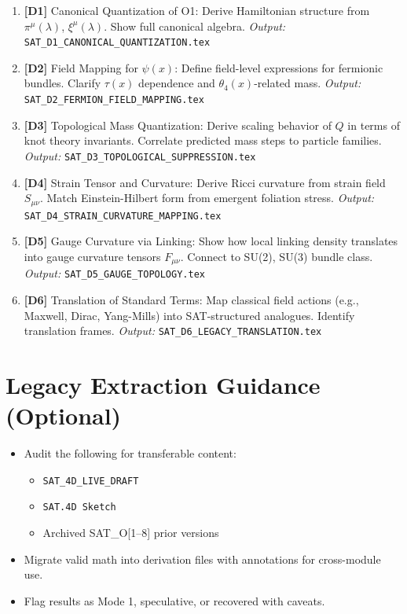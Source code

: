 \documentclass[12pt]{article}
\begin{document}
\begin{enumerate}
    \item \textbf{[D1]} Canonical Quantization of O1:  
    Derive Hamiltonian structure from \(\pi^\mu(\lambda)\), \(\xi^\mu(\lambda)\). Show full canonical algebra.  
    \textit{Output:} \texttt{SAT\_D1\_CANONICAL\_QUANTIZATION.tex}

    \item \textbf{[D2]} Field Mapping for \(\psi(x)\):  
    Define field-level expressions for fermionic bundles. Clarify \(\tau(x)\) dependence and \( \theta_4(x) \)-related mass.  
    \textit{Output:} \texttt{SAT\_D2\_FERMION\_FIELD\_MAPPING.tex}

    \item \textbf{[D3]} Topological Mass Quantization:  
    Derive scaling behavior of \( Q \) in terms of knot theory invariants. Correlate predicted mass steps to particle families.  
    \textit{Output:} \texttt{SAT\_D3\_TOPOLOGICAL\_SUPPRESSION.tex}

    \item \textbf{[D4]} Strain Tensor and Curvature:  
    Derive Ricci curvature from strain field \( S_{\mu\nu} \). Match Einstein-Hilbert form from emergent foliation stress.  
    \textit{Output:} \texttt{SAT\_D4\_STRAIN\_CURVATURE\_MAPPING.tex}

    \item \textbf{[D5]} Gauge Curvature via Linking:  
    Show how local linking density translates into gauge curvature tensors \( F_{\mu\nu} \). Connect to SU(2), SU(3) bundle class.  
    \textit{Output:} \texttt{SAT\_D5\_GAUGE\_TOPOLOGY.tex}

    \item \textbf{[D6]} Translation of Standard Terms:  
    Map classical field actions (e.g., Maxwell, Dirac, Yang-Mills) into SAT-structured analogues. Identify translation frames.  
    \textit{Output:} \texttt{SAT\_D6\_LEGACY\_TRANSLATION.tex}
\end{enumerate}

\section*{Legacy Extraction Guidance (Optional)}

\begin{itemize}
    \item Audit the following for transferable content:
        \begin{itemize}
            \item \texttt{SAT\_4D\_LIVE\_DRAFT}
            \item \texttt{SAT.4D Sketch}
            \item Archived SAT\_O[1–8] prior versions
        \end{itemize}
    \item Migrate valid math into derivation files with annotations for cross-module use.
    \item Flag results as Mode 1, speculative, or recovered with caveats.
\end{itemize}
\end{document}
